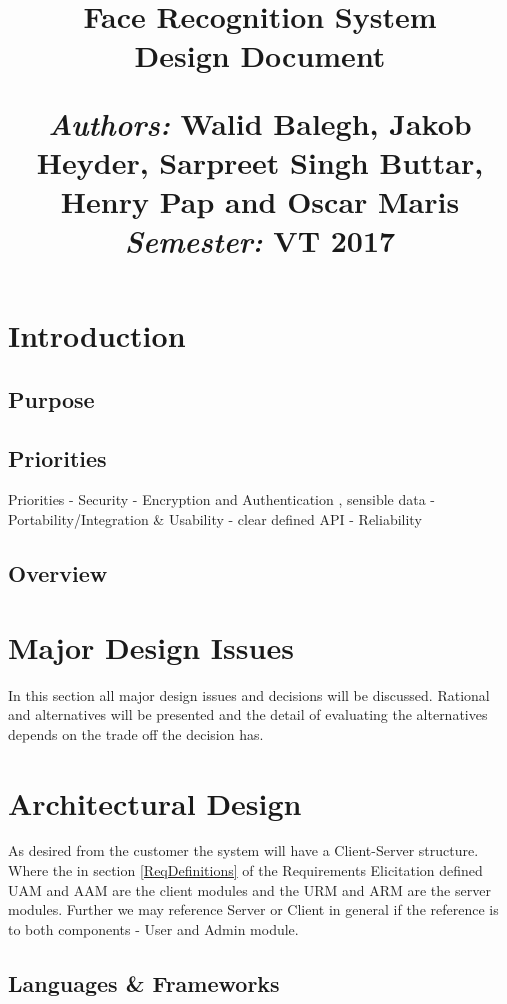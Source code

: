 \documentclass[a4paper,11pt]{article}
\title{
\vspace{-8cm}
\begin{flushleft}
    \vspace{10cm}
    \normalfont \normalsize
    \vspace{-1.3cm}
\end{flushleft}
\vspace{3cm}
\begin{flushleft}
    \huge Face Recognition System \\
    \LARGE  Design Document\\
\end{flushleft}
\null
\vfill
\begin{minipage}{\textwidth}
\begin{flushleft} \large
\emph{Authors:} Walid Balegh, Jakob Heyder, Sarpreet Singh Buttar, Henry \hspace{45pt} Pap and Oscar Maris \\ %
\emph{Semester:} VT 2017\\ %
\end{flushleft}
\end{minipage}
}
\date{}
\begin{document}
\maketitle

\newpage

\tableofcontents

\newpage


\section{Introduction}

\subsection{Purpose}

\subsection{Priorities}
Priorities
	- Security - Encryption and Authentication , sensible data
	- Portability/Integration \& Usability - clear defined API
	- Reliability

\subsection{Overview}

\section{Major Design Issues}
In this section all major design issues and decisions will be discussed. Rational and alternatives will be presented and the detail of evaluating the alternatives depends on the trade off the decision has. 

\section{Architectural Design}
As desired from the customer the system will have a Client-Server structure. Where the in section \ref{ReqDefinitions} of the Requirements Elicitation defined UAM and AAM are the client modules and the URM and ARM are the server modules. Further we may reference Server or Client in general if  the reference is to both components - User and Admin module.

\subsection{Languages \& Frameworks}
\end{document}
